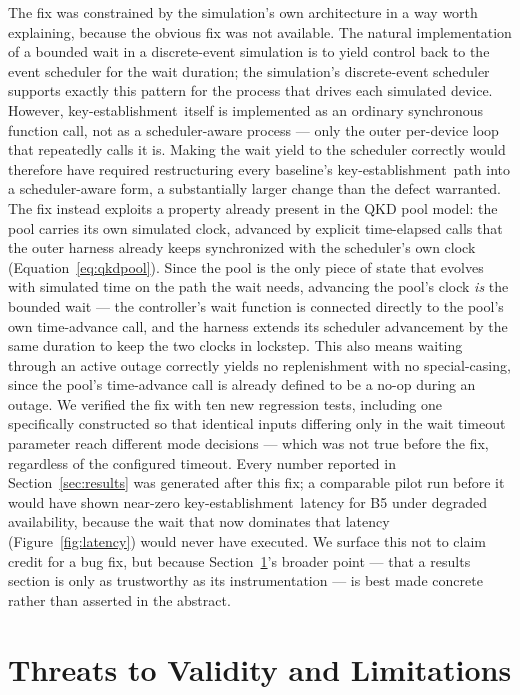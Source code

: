 \documentclass[journal]{IEEEtran}
\newcommand{\keyest}{key-establishment}
\begin{document}
The fix was constrained by the simulation's own architecture in a way worth explaining, because the obvious fix was not available. The natural implementation of a bounded wait in a discrete-event simulation is to yield control back to the event scheduler for the wait duration; the simulation's discrete-event scheduler supports exactly this pattern for the process that drives each simulated device. However, \keyest\ itself is implemented as an ordinary synchronous function call, not as a scheduler-aware process --- only the outer per-device loop that repeatedly calls it is. Making the wait yield to the scheduler correctly would therefore have required restructuring every baseline's \keyest\ path into a scheduler-aware form, a substantially larger change than the defect warranted. The fix instead exploits a property already present in the QKD pool model: the pool carries its own simulated clock, advanced by explicit time-elapsed calls that the outer harness already keeps synchronized with the scheduler's own clock (Equation~\eqref{eq:qkdpool}). Since the pool is the only piece of state that evolves with simulated time on the path the wait needs, advancing the pool's clock \emph{is} the bounded wait --- the controller's wait function is connected directly to the pool's own time-advance call, and the harness extends its scheduler advancement by the same duration to keep the two clocks in lockstep. This also means waiting through an active outage correctly yields no replenishment with no special-casing, since the pool's time-advance call is already defined to be a no-op during an outage. We verified the fix with ten new regression tests, including one specifically constructed so that identical inputs differing only in the wait timeout parameter reach different mode decisions --- which was not true before the fix, regardless of the configured timeout. Every number reported in Section~\ref{sec:results} was generated after this fix; a comparable pilot run before it would have shown near-zero \keyest\ latency for B5 under degraded availability, because the wait that now dominates that latency (Figure~\ref{fig:latency}) would never have executed. We surface this not to claim credit for a bug fix, but because Section~\ref{sec:limitations}'s broader point --- that a results section is only as trustworthy as its instrumentation --- is best made concrete rather than asserted in the abstract.

\section{Threats to Validity and Limitations}
\label{sec:limitations}
\end{document}
